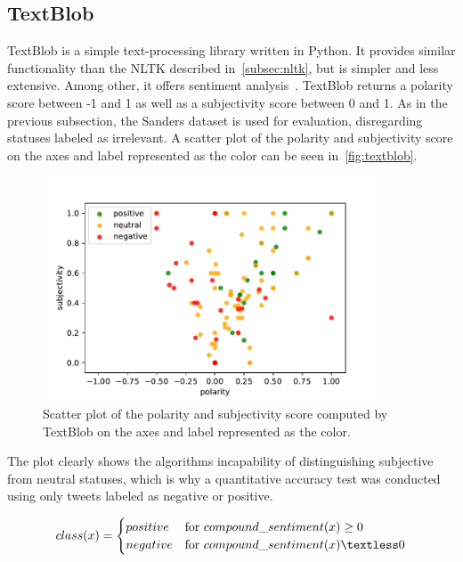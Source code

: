 \subsection{TextBlob}
\label{subsec:textblob}

TextBlob is a simple text-processing library written in Python.
It provides similar functionality than the NLTK described in~\autoref{subsec:nltk},
but is simpler and less extensive.
Among other, it offers sentiment analysis~\cite{textblobDocs}.
TextBlob returns a polarity score between -1 and 1 as well as a subjectivity score between 0 and 1.
As in the previous subsection, the Sanders dataset is used for evaluation, disregarding statuses labeled as irrelevant.
A scatter plot of the polarity and subjectivity score on the axes and label represented as the color can be seen in~\autoref{fig:textblob}.

\begin{figure}
    \centering
    \caption{Scatter plot of the polarity and subjectivity score computed by TextBlob on the axes and label represented as the color.}
    \label{fig:textblob}
    \includegraphics[width=10cm]{../figures/textblob.pdf}
\end{figure}

The plot clearly shows the algorithms incapability of distinguishing subjective from neutral statuses,
which is why a quantitative accuracy test was conducted using only tweets labeled as negative or positive.

\begin{equation}
    class(x) =
    \begin{cases}
        positive & \text{for } compound\_sentiment(x) \geq 0 \\
        negative & \text{for } compound\_sentiment(x) \textless 0\\
    \end{cases}
\end{equation}

